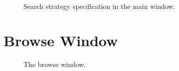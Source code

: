 \documentclass{article}
\begin{document}
\begin{figure}
\begin{center}
\centering
{}
\caption{Search strategy specification in the main window.}
\end{center}
\label{fig:searchstrategy}
\end{figure}






\section{Browse Window}
\label{section:browse-window}

\begin{figure}
\begin{center}
\centering
{}
\caption{The browse window.}
\end{center}
\label{fig:browsewindow}
\end{figure}
\end{document}
